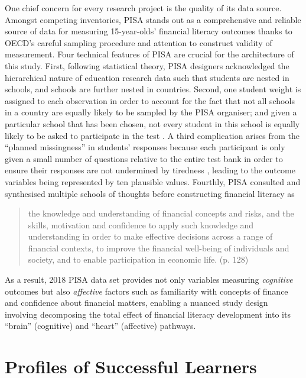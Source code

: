 \documentclass[a4paper,11pt,UKenglish,twoside,openright]{report}\usepackage[]{graphicx}\usepackage[]{color}
\begin{document}
One chief concern for every research project is the quality of its data source. Amongst competing inventories, PISA stands out as a comprehensive and reliable source of data for measuring 15-year-olds' financial literacy outcomes thanks to OECD's careful sampling procedure and attention to construct validity of measurement. Four technical features of PISA are crucial for the architecture of this study. First, following statistical theory, PISA designers acknowledged the hierarchical nature of education research data such that students are nested in schools, and schools are further nested in countries. Second, one student weight is assigned to each observation in order to account for the fact that not all schools in a country are equally likely to be sampled by the PISA organiser; and given a particular school that has been chosen, not every student in this school is equally likely to be asked to participate in the test \parencite{rust:2014}. A third complication arises from the ``planned missingness'' in students' responses because each participant is only given a small number of questions relative to the entire test bank in order to ensure their responses are not undermined by tiredness \parencite{vondavier:2014}, leading to the outcome variables being represented by ten plausible values. Fourthly, PISA consulted and synthesised multiple schools of thoughts \parencite{PISAframework} before constructing financial literacy as \blockquote{the knowledge and understanding of financial concepts and risks, and the skills, motivation and confidence to apply such knowledge and understanding in order to make effective decisions across a range of financial contexts, to improve the financial well-being of individuals and society, and to enable participation in economic life. (p. 128)} As a result, 2018 PISA data set \parencite{FLdata} provides not only variables measuring \emph{cognitive} outcomes but also \emph{affective} factors such as familiarity with concepts of finance and confidence about financial matters, enabling a nuanced study design involving decomposing the total effect of financial literacy development into its ``brain'' (cognitive) and ``heart'' (affective) pathways.







\section{Profiles of Successful Learners}
\end{document}

